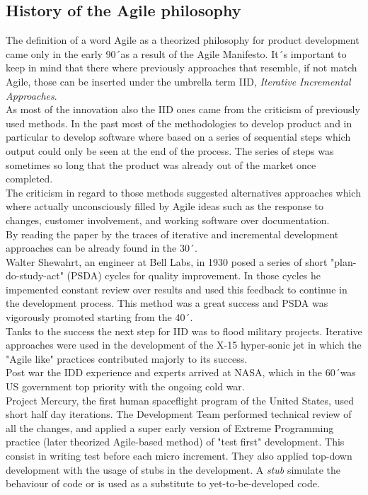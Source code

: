 \documentclass[../main.tex]{subfiles}
\begin{document}
\subsection{History of the Agile philosophy}
The definition of a word Agile as a theorized philosophy for product development came only in the early 90´as a result of the Agile Manifesto. It´s important to keep in mind that there where previously approaches that resemble, if not match Agile, those can be inserted under the umbrella term IID, \textit{Iterative Incremental Approaches}.\\
As most of the innovation also the IID ones came from the criticism of previously used methods. In the past most of the methodologies to develop product and in particular to develop software where based on a series of sequential steps which output could only be seen at the end of the process. The series of steps was sometimes so long that the product was already out of the market once completed.\\
The criticism in regard to those methods suggested alternatives approaches which where actually unconsciously filled by Agile ideas such as the response to changes, customer involvement, and working software over documentation.\\
By reading the paper by \citet{larman2003iterative} the traces of iterative and incremental development approaches can be already found in the 30´. \\
Walter Shewahrt, an engineer at Bell Labs, in 1930 posed a series of short "plan-do-study-act" (PSDA) cycles for quality improvement. In those cycles he impemented constant review over results and used this feedback to continue in the development process. This method was a great success and PSDA was vigorously promoted starting from the 40´.\\ 
Tanks to the success the next step for IID was to flood military projects. Iterative approaches were used in the development of the X-15 hyper-sonic jet in which the "Agile like" practices contributed majorly to its success.\\ Post war the IDD experience and experts arrived at NASA, which in the 60´was US government top priority with the ongoing cold war.\\
Project Mercury, the first human spaceflight program of the United States, used short half day iterations. The Development Team performed technical review of all the changes, and applied a super early version of Extreme Programming practice (later theorized Agile-based method) of "test first" development. This consist in writing test before each micro increment. They also applied top-down development with the usage of stubs in the development. A \textit{stub} simulate the behaviour of code or is used as a substitute to yet-to-be-developed code.\\ 
\end{document}
